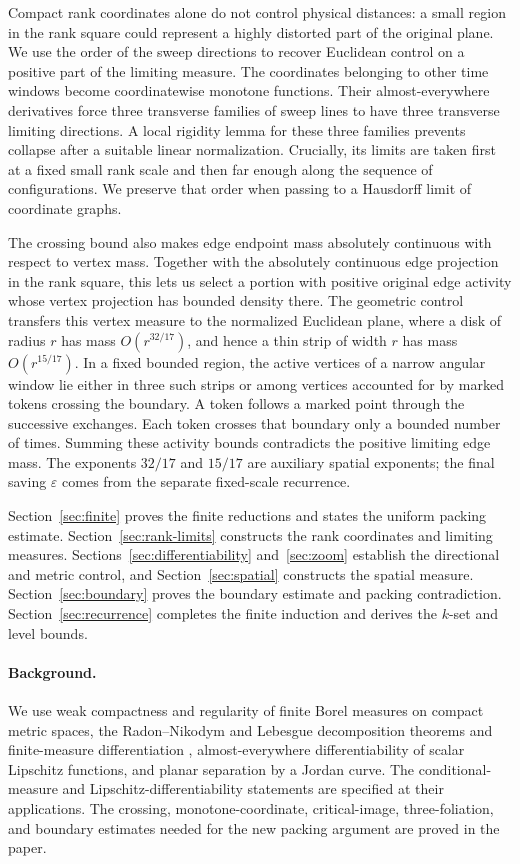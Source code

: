 Compact rank coordinates alone do not control physical distances:
a small region in the rank square could represent a highly distorted
part of the original plane. We use the order of the sweep directions
to recover Euclidean control on a positive part of the limiting measure.
The coordinates belonging to other time windows become coordinatewise
monotone functions. Their almost-everywhere derivatives force three
transverse families of sweep lines to have three transverse limiting
directions. A local rigidity lemma for these three families prevents
collapse after a suitable linear normalization. Crucially, its limits
are taken first at a fixed small rank scale and then far enough along
the sequence of configurations. We preserve that order when passing
to a Hausdorff limit of coordinate graphs.

The crossing bound also makes edge endpoint mass absolutely continuous
with respect to vertex mass. Together with the absolutely continuous
edge projection in the rank square, this lets us select a portion with
positive original edge activity whose vertex projection has bounded
density there. The geometric control transfers this
vertex measure to the normalized Euclidean plane, where a disk of
radius $r$ has mass $O(r^{32/17})$, and hence a thin strip of width $r$
has mass $O(r^{15/17})$. In a fixed bounded region, the active vertices
of a narrow angular window lie either in three such strips or among
vertices accounted for by marked tokens crossing the boundary. A token
follows a marked point through the successive exchanges. Each
token crosses that boundary only a bounded number of times. Summing
these activity bounds contradicts the positive limiting edge mass.
The exponents $32/17$ and $15/17$ are auxiliary spatial exponents;
the final saving $\varepsilon$ comes from the separate fixed-scale
recurrence.

Section~\ref{sec:finite} proves the finite reductions and states the
uniform packing estimate. Section~\ref{sec:rank-limits} constructs the
rank coordinates and limiting measures. Sections~\ref{sec:differentiability}
and~\ref{sec:zoom} establish the directional and metric control, and
Section~\ref{sec:spatial} constructs the spatial measure.
Section~\ref{sec:boundary} proves the boundary estimate and packing
contradiction. Section~\ref{sec:recurrence} completes the finite induction
and derives the $k$-set and level bounds.

\paragraph{Background.}
We use weak compactness and regularity of finite Borel measures on
compact metric spaces, the Radon--Nikodym and Lebesgue decomposition
theorems and finite-measure differentiation
\cite[Chapter~1, Section~3]{Simon2014GMT}, almost-everywhere differentiability
of scalar Lipschitz functions, and planar separation by a Jordan curve.
The conditional-measure and Lipschitz-differentiability statements are
specified at their applications. The crossing, monotone-coordinate,
critical-image, three-foliation, and boundary estimates needed for the
new packing argument are proved in the paper.
